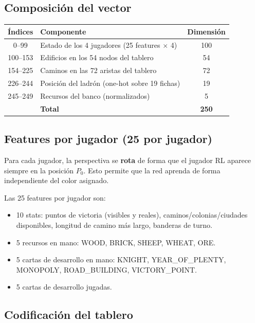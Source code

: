 \documentclass[11pt, a4paper]{article}
\begin{document}
\subsection{Composición del vector}

\begin{center}
\begin{tabular}{clc}
  \toprule
  \textbf{Índices} & \textbf{Componente} & \textbf{Dimensión} \\
  \midrule
  0--99   & Estado de los 4 jugadores (25 features $\times$ 4)  & 100 \\
  100--153 & Edificios en los 54 nodos del tablero               & 54  \\
  154--225 & Caminos en las 72 aristas del tablero               & 72  \\
  226--244 & Posición del ladrón (one-hot sobre 19 fichas)       & 19  \\
  245--249 & Recursos del banco (normalizados)                   & 5   \\
  \midrule
  & \textbf{Total}                                              & \textbf{250} \\
  \bottomrule
\end{tabular}
\end{center}

\subsection{Features por jugador (25 por jugador)}

Para cada jugador, la perspectiva se \textbf{rota} de forma que el jugador RL aparece
siempre en la posición $P_0$. Esto permite que la red aprenda de forma independiente
del color asignado.

Las 25 features por jugador son:
\begin{itemize}[noitemsep]
  \item 10 stats: puntos de victoria (visibles y reales), caminos/colonias/ciudades
        disponibles, longitud de camino más largo, banderas de turno.
  \item 5 recursos en mano: WOOD, BRICK, SHEEP, WHEAT, ORE.
  \item 5 cartas de desarrollo en mano: KNIGHT, YEAR\_OF\_PLENTY, MONOPOLY,
        ROAD\_BUILDING, VICTORY\_POINT.
  \item 5 cartas de desarrollo jugadas.
\end{itemize}

\subsection{Codificación del tablero}
\end{document}
